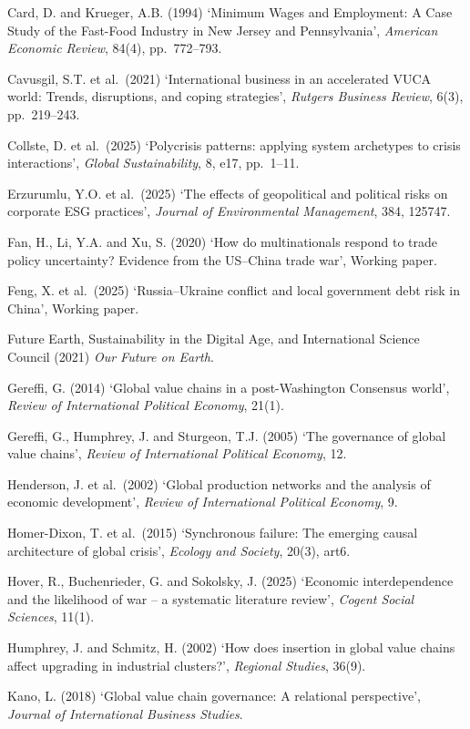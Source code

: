 \documentclass[authoryear,preprint,review,12pt]{elsarticle}
\begin{document}
Card, D. and Krueger, A.B. (1994) `Minimum Wages and Employment: A Case Study of the Fast-Food Industry in New Jersey and Pennsylvania', \textit{American Economic Review}, 84(4), pp.\ 772--793.

Cavusgil, S.T. et al.\ (2021) `International business in an accelerated VUCA world: Trends, disruptions, and coping strategies', \textit{Rutgers Business Review}, 6(3), pp.\ 219--243.

Collste, D. et al.\ (2025) `Polycrisis patterns: applying system archetypes to crisis interactions', \textit{Global Sustainability}, 8, e17, pp.\ 1--11.

Erzurumlu, Y.O. et al.\ (2025) `The effects of geopolitical and political risks on corporate ESG practices', \textit{Journal of Environmental Management}, 384, 125747.

Fan, H., Li, Y.A. and Xu, S. (2020) `How do multinationals respond to trade policy uncertainty? Evidence from the US--China trade war', Working paper.

Feng, X. et al.\ (2025) `Russia--Ukraine conflict and local government debt risk in China', Working paper.

Future Earth, Sustainability in the Digital Age, and International Science Council (2021) \textit{Our Future on Earth}.

Gereffi, G. (2014) `Global value chains in a post-Washington Consensus world', \textit{Review of International Political Economy}, 21(1).

Gereffi, G., Humphrey, J. and Sturgeon, T.J. (2005) `The governance of global value chains', \textit{Review of International Political Economy}, 12.

Henderson, J. et al.\ (2002) `Global production networks and the analysis of economic development', \textit{Review of International Political Economy}, 9.

Homer-Dixon, T. et al.\ (2015) `Synchronous failure: The emerging causal architecture of global crisis', \textit{Ecology and Society}, 20(3), art6.

Hover, R., Buchenrieder, G. and Sokolsky, J. (2025) `Economic interdependence and the likelihood of war -- a systematic literature review', \textit{Cogent Social Sciences}, 11(1).

Humphrey, J. and Schmitz, H. (2002) `How does insertion in global value chains affect upgrading in industrial clusters?', \textit{Regional Studies}, 36(9).

Kano, L. (2018) `Global value chain governance: A relational perspective', \textit{Journal of International Business Studies}.
\end{document}

